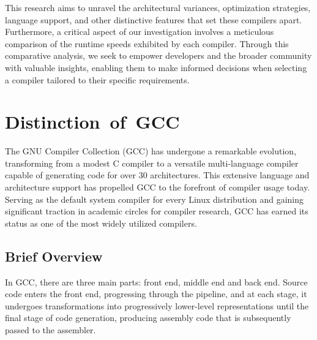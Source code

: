 \documentclass[conference]{IEEEtran}
\begin{document}
This research aims to unravel the architectural variances, optimization strategies, language support, and other distinctive features that set these compilers apart. Furthermore, a critical aspect of our investigation involves a meticulous comparison of the runtime speeds exhibited by each compiler. Through this comparative analysis, we seek to empower developers and the broader community with valuable insights, enabling them to make informed decisions when selecting a compiler tailored to their specific requirements.

\section{Distinction of GCC}
The GNU Compiler Collection (GCC) has undergone a remarkable evolution, transforming from a modest C compiler to a versatile multi-language compiler capable of generating code for over 30 architectures. This extensive language and architecture support has propelled GCC to the forefront of compiler usage today. Serving as the default system compiler for every Linux distribution and gaining significant traction in academic circles for compiler research, GCC has earned its status as one of the most widely utilized compilers.

\subsection{Brief Overview}

In GCC, there are three main parts: front end, middle end and back end. Source code enters the front end, progressing through the pipeline, and at each stage, it undergoes transformations into progressively lower-level representations until the final stage of code generation, producing assembly code that is subsequently passed to the assembler.
\end{document}
